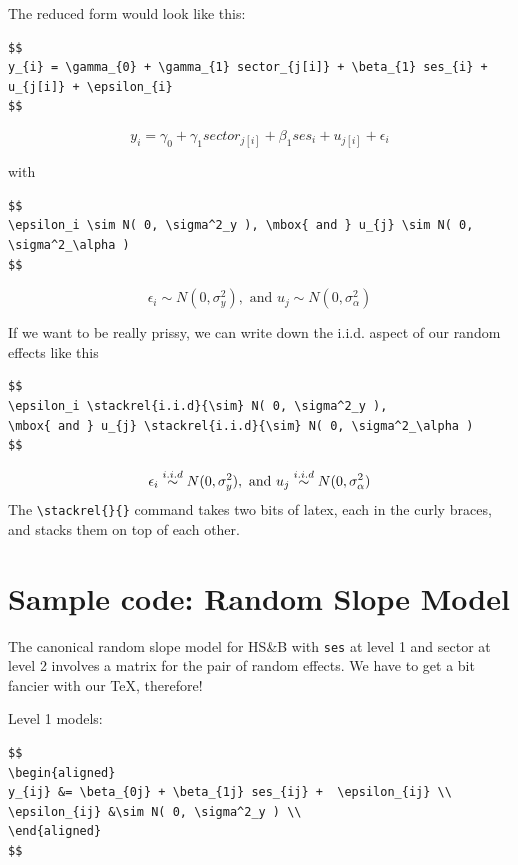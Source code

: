 \documentclass[
  letterpaper,
  DIV=11,
  numbers=noendperiod]{scrreprt}
\begin{document}
The reduced form would look like this:

\begin{verbatim}
$$
y_{i} = \gamma_{0} + \gamma_{1} sector_{j[i]} + \beta_{1} ses_{i} + u_{j[i]} + \epsilon_{i}
$$
\end{verbatim}

\[
y_{i} = \gamma_{0} + \gamma_{1} sector_{j[i]} + \beta_{1} ses_{i} + u_{j[i]} + \epsilon_{i}
\]

with

\begin{verbatim}
$$
\epsilon_i \sim N( 0, \sigma^2_y ), \mbox{ and } u_{j} \sim N( 0, \sigma^2_\alpha )
$$
\end{verbatim}

\[
\epsilon_i \sim N( 0, \sigma^2_y ), \mbox{ and } u_{j} \sim N( 0, \sigma^2_\alpha )
\]

If we want to be really prissy, we can write down the i.i.d. aspect of
our random effects like this

\begin{verbatim}
$$
\epsilon_i \stackrel{i.i.d}{\sim} N( 0, \sigma^2_y ), 
\mbox{ and } u_{j} \stackrel{i.i.d}{\sim} N( 0, \sigma^2_\alpha )
$$
\end{verbatim}

\[
\epsilon_i \stackrel{i.i.d}{\sim} N( 0, \sigma^2_y ), \\
\mbox{ and } u_{j} \stackrel{i.i.d}{\sim} N( 0, \sigma^2_\alpha )
\] The \texttt{\textbackslash{}stackrel\{\}\{\}} command takes two bits
of latex, each in the curly braces, and stacks them on top of each
other.

\section{Sample code: Random Slope
Model}\label{sample-code-random-slope-model}

The canonical random slope model for HS\&B with \texttt{ses} at level 1
and sector at level 2 involves a matrix for the pair of random effects.
We have to get a bit fancier with our TeX, therefore!

Level 1 models:

\begin{verbatim}
$$
\begin{aligned}
y_{ij} &= \beta_{0j} + \beta_{1j} ses_{ij} +  \epsilon_{ij} \\
\epsilon_{ij} &\sim N( 0, \sigma^2_y ) \\
\end{aligned}
$$
\end{verbatim}
\end{document}
